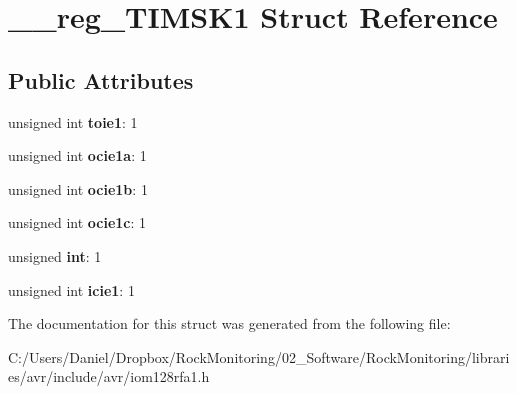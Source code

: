 \hypertarget{struct____reg___t_i_m_s_k1}{}\section{\+\_\+\+\_\+reg\+\_\+\+T\+I\+M\+S\+K1 Struct Reference}
\label{struct____reg___t_i_m_s_k1}
\subsection*{Public Attributes}
\begin{DoxyCompactItemize}
\item 
unsigned int {\bfseries toie1}\+: 1\hypertarget{struct____reg___t_i_m_s_k1_a7675f2d12a0d57cf31c36d175fa4141d}{}\label{struct____reg___t_i_m_s_k1_a7675f2d12a0d57cf31c36d175fa4141d}

\item 
unsigned int {\bfseries ocie1a}\+: 1\hypertarget{struct____reg___t_i_m_s_k1_abe28542e5ab91c87e96b719226572bd1}{}\label{struct____reg___t_i_m_s_k1_abe28542e5ab91c87e96b719226572bd1}

\item 
unsigned int {\bfseries ocie1b}\+: 1\hypertarget{struct____reg___t_i_m_s_k1_a025249d194c88f232c94e834d65ee4f8}{}\label{struct____reg___t_i_m_s_k1_a025249d194c88f232c94e834d65ee4f8}

\item 
unsigned int {\bfseries ocie1c}\+: 1\hypertarget{struct____reg___t_i_m_s_k1_aaff97dc92cf48767fcaf3a7949df7c3d}{}\label{struct____reg___t_i_m_s_k1_aaff97dc92cf48767fcaf3a7949df7c3d}

\item 
unsigned {\bfseries int}\+: 1\hypertarget{struct____reg___t_i_m_s_k1_a726413eed24758e2f3832ccfe0c8f012}{}\label{struct____reg___t_i_m_s_k1_a726413eed24758e2f3832ccfe0c8f012}

\item 
unsigned int {\bfseries icie1}\+: 1\hypertarget{struct____reg___t_i_m_s_k1_a5e42f3af35fa932dbcb7f0d511f3a0e8}{}\label{struct____reg___t_i_m_s_k1_a5e42f3af35fa932dbcb7f0d511f3a0e8}

\end{DoxyCompactItemize}


The documentation for this struct was generated from the following file\+:\begin{DoxyCompactItemize}
\item 
C\+:/\+Users/\+Daniel/\+Dropbox/\+Rock\+Monitoring/02\+\_\+\+Software/\+Rock\+Monitoring/libraries/avr/include/avr/iom128rfa1.\+h\end{DoxyCompactItemize}
